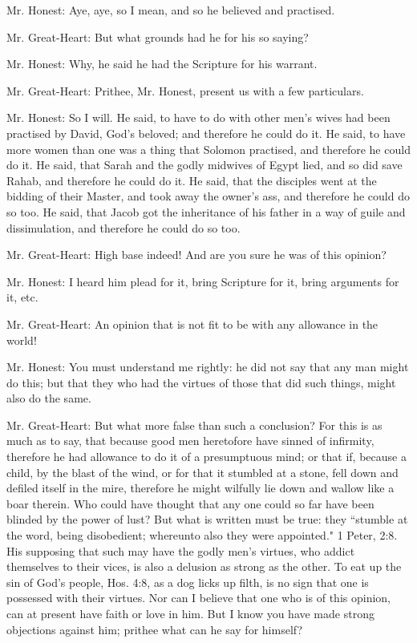 Mr. Honest: Aye, aye, so I mean, and so he believed and practised.

Mr. Great-Heart: But what grounds had he for his so saying?

Mr. Honest: Why, he said he had the Scripture for his warrant.

Mr. Great-Heart: Prithee, Mr. Honest, present us with a few particulars.

Mr. Honest: So I will. He said, to have to do with other men's wives had been practised by David, God's beloved; and therefore he could do it. He said, to have more women than one was a thing that Solomon practised, and therefore he could do it. He said, that Sarah and the godly midwives of Egypt lied, and so did save Rahab, and therefore he could do it. He said, that the disciples went at the bidding of their Master, and took away the owner's ass, and therefore he could do so too. He said, that Jacob got the inheritance of his father in a way of guile and dissimulation, and therefore he could do so too.

Mr. Great-Heart: High base indeed! And are you sure he was of this opinion?

Mr. Honest: I heard him plead for it, bring Scripture for it, bring arguments for it, etc.

Mr. Great-Heart: An opinion that is not fit to be with any allowance in the world!

Mr. Honest: You must understand me rightly: he did not say that any man might do this; but that they who had the virtues of those that did such things, might also do the same.

Mr. Great-Heart: But what more false than such a conclusion? For this is as much as to say, that because good men heretofore have sinned of infirmity, therefore he had allowance to do it of a presumptuous mind; or that if, because a child, by the blast of the wind, or for that it stumbled at a stone, fell down and defiled itself in the mire, therefore he might wilfully lie down and wallow like a boar therein. Who could have thought that any one could so far have been blinded by the power of lust? But what is written must be true: they ``stumble at the word, being disobedient; whereunto also they were appointed." 1 Peter, 2:8. His supposing that such may have the godly men's virtues, who addict themselves to their vices, is also a delusion as strong as the other. To eat up the sin of God's people, Hos. 4:8, as a dog licks up filth, is no sign that one is possessed with their virtues. Nor can I believe that one who is of this opinion, can at present have faith or love in him. But I know you have made strong objections against him; prithee what can he say for himself?


